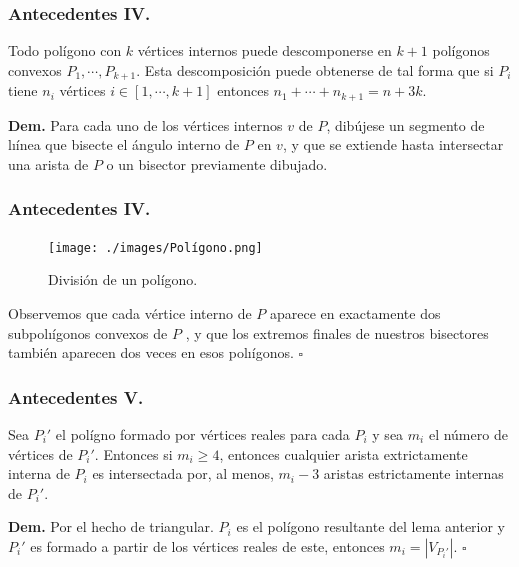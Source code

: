 \begin{frame}
  \frametitle{Antecedentes IV.}    
  \begin{lema}
    Todo polígono con $k$ vértices internos puede descomponerse en $k + 1$ polígonos
    convexos $P_1, \dotsm, P_{k + 1}$. Esta descomposición puede obtenerse de tal forma
    que si $P_i$ tiene $n_i$ vértices $i \in [1, \dotsm, k+1]$ entonces $n_1 + \dotsm + n_{k + 1} = n + 3k$.
  \end{lema}
  \textbf{Dem.} Para cada uno de los vértices internos $v$ de $P$, dibújese un
  segmento de lıínea que bisecte el ángulo interno de $P$ en $v$, y que se extiende hasta
  intersectar una arista de $P$ o un bisector previamente dibujado.\newline
\end{frame}

\begin{frame}
  \frametitle{Antecedentes IV.}    
  \begin{figure}
    \centering
    \texttt{[image: ./images/Polígono.png]}
    \caption*{División de un polígono.}
  \end{figure}
  Observemos que cada vértice interno de $P$ aparece en exactamente dos
  subpolıígonos convexos de $P$ , y que los extremos finales de nuestros bisectores
  también aparecen dos veces en esos polıígonos. \hfill $\square$
\end{frame}

\begin{frame}
  \frametitle{Antecedentes V.}
  \begin{lema}
    Sea $P_i'$ el polígno formado por vértices reales para cada $P_i$ y sea $m_i$ el número
    de vértices de $P_i'$. Entonces si $m_i \geq 4$, entonces cualquier arista extrictamente
    interna de $P_i$ es intersectada por, al menos, $m_i - 3$ aristas estrictamente internas
    de $P_i'$.
  \end{lema}
  \textbf{Dem.} Por el hecho de triangular. $P_i$ es el polígono resultante del lema anterior
  y $P_i'$ es formado a partir de los vértices reales de este, entonces $m_i = |V_{P_i'}|$.
  \hfill $\square$
\end{frame}
